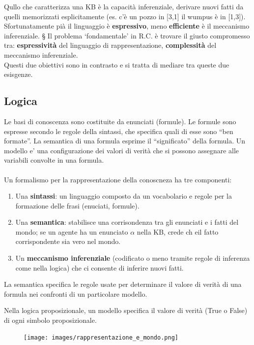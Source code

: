 Qullo che caratterizza una KB è la capacità inferenziale, derivare nuovi fatti da quelli memorizzati esplicitamente (es. c'è un pozzo in [3,1] il wumpus è in [1,3]).\\
Sfortunatamente pià il linguaggio è \textbf{espressivo}, meno \textbf{efficiente} è il meccanismo inferenziale. § Il problema ‘fondamentale’ in R.C. è trovare il giusto
compromesso tra: \textbf{espressività} del linguaggio di rappresentazione, \textbf{complessità} del meccanismo inferenziale.\\
Questi due obiettivi sono in contrasto e si tratta di mediare tra queste due esisgenze.

\subsection{Logica}
Le basi di conoscenza sono costituite da enunciati (formule). Le formule sono espresse secondo le regole della sintassi,
che specifica quali di esse sono “ben formate”. La semantica di una formula esprime il “significato” della
formula. Un modello e’ una configurazione dei valori di verità che si possono assegnare alle variabili convolte in una formula.\\\\
Un formalismo per la rappresentazione della conoscneza ha tre componenti:
\begin{enumerate}
    \item Una \textbf{sintassi}: un linguaggio composto da un vocabolario e regole per la formazione delle frasi (enuciati, formule).
    \item Una \textbf{semantica}: stabilisce una corrisondenza tra gli enunciati e i fatti del mondo; se un agente ha un enunciato $\alpha$ nella KB, crede ch eil fatto corrispondente sia vero nel mondo.
    \item Un \textbf{meccanismo inferenziale} (codificato o meno tramite regole di inferenza come nella logica) che ci consente di inferire nuovi fatti.
\end{enumerate}
\begin{definition}[Semantica]
    La semantica specifica le regole usate per determinare il valore di verità di una formula nei confronti di un particolare modello.
\end{definition}
Nella logica proposizionale, un modello specifica il valore di verità (True o False) di ogni simbolo proposizionale.
\begin{figure}[h!]
    \centering
    \texttt{[image: images/rappresentazione\_e\_mondo.png]}
\end{figure}

